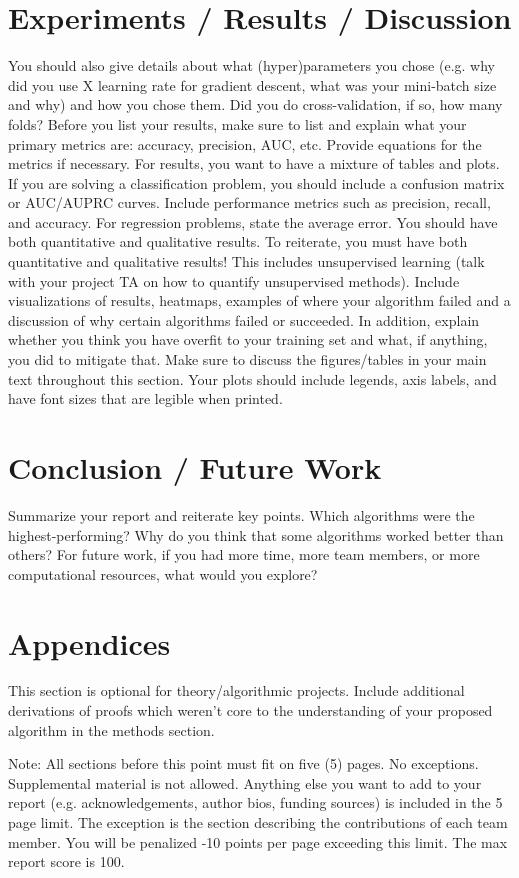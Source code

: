 \documentclass{article}
\begin{document}
\section{Experiments / Results / Discussion}
You should also give details about what (hyper)parameters you chose (e.g. why did you use X learning rate for gradient descent, what was your mini-batch size and why) and how you chose them. Did you do cross-validation, if so, how many folds? Before you list your results, make sure to list and explain what your primary metrics are: accuracy, precision, AUC, etc. Provide equations for the metrics if necessary. For results, you want to have a mixture of tables and plots. If you are solving a classification problem, you should include a confusion matrix or AUC/AUPRC curves. Include performance metrics such as precision, recall, and accuracy. For regression problems, state the average error. You should have both quantitative and qualitative results. To reiterate, you must have both quantitative and qualitative results! This includes unsupervised learning (talk with your project TA on how to quantify unsupervised methods). Include visualizations of results, heatmaps, examples of where your algorithm failed and a discussion of why certain algorithms failed or succeeded. In addition, explain whether you think you have overfit to your training set and what, if anything, you did to mitigate that. Make sure to discuss the figures/tables in your main text throughout this section. Your plots should include legends, axis labels, and have font sizes that are legible when printed.


\section{Conclusion / Future Work}
Summarize your report and reiterate key points. Which algorithms were the highest-performing? Why do you think that some algorithms worked better than others? For future work, if you had more time, more team members, or more computational resources, what would you explore?

\section{Appendices}
This section is optional for theory/algorithmic projects. Include additional derivations of proofs which weren’t core to the understanding of your proposed algorithm in the methods section.


Note: All sections before this point must fit on five (5) pages. No exceptions. Supplemental material is not allowed. Anything else you want to add to your report (e.g. acknowledgements, author bios, funding sources) is included in the 5 page limit. The exception is the section describing the contributions of each team member. You will be penalized -10 points per page exceeding this limit. The max report score is 100.
\end{document}

